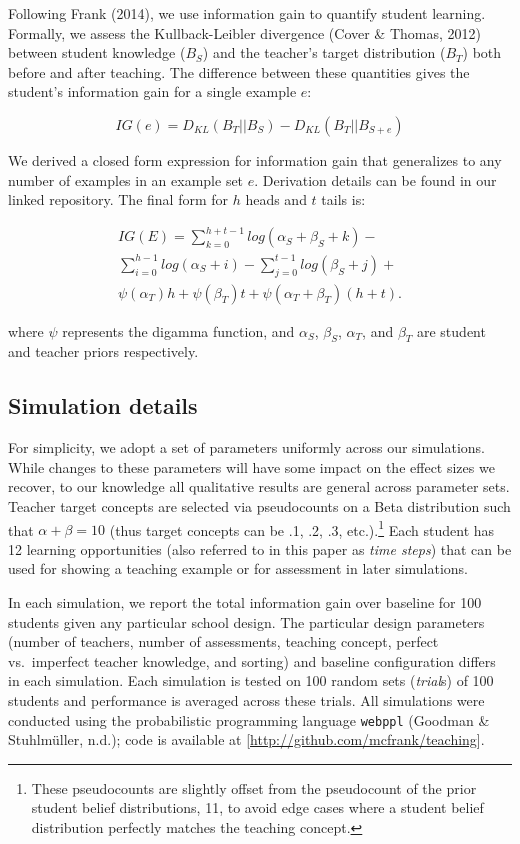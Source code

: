 \documentclass[10pt, letterpaper]{article}
\begin{document}
Following Frank (2014), we use information gain to quantify student
learning. Formally, we assess the Kullback-Leibler divergence (Cover \&
Thomas, 2012) between student knowledge (\(B_S\)) and the teacher's
target distribution (\(B_T\)) both before and after teaching. The
difference between these quantities gives the student's information gain
for a single example \(e\):

\[IG(e) = D_{KL}(B_T ||B_S) - D_{KL}(B_T || B_{S+e})\]

We derived a closed form expression for information gain that
generalizes to any number of examples in an example set \(e\).
Derivation details can be found in our linked repository. The final form
for \(h\) heads and \(t\) tails is:

\begin{multline}
IG(E) = \sum_{k=0}^{h+t-1} {log(\alpha_S + \beta_S + k)} - \\
\sum_{i=0}^{h-1} {log (\alpha_S + i)} - \sum_{j=0}^{t-1} {log(\beta_S +j)} + \\
\psi(\alpha_T)h + \psi(\beta_T)t +  \psi(\alpha_T + \beta_T)(h+t).
\end{multline}

\noindent where \(\psi\) represents the digamma function, and
\(\alpha_S\), \(\beta_S\), \(\alpha_T\), and \(\beta_T\) are student and
teacher priors respectively.

\subsection{Simulation details}\label{simulation-details}

For simplicity, we adopt a set of parameters uniformly across our
simulations. While changes to these parameters will have some impact on
the effect sizes we recover, to our knowledge all qualitative results
are general across parameter sets. Teacher target concepts are selected
via pseudocounts on a Beta distribution such that
\(\alpha + \beta = 10\) (thus target concepts can be .1, .2, .3,
etc.).\footnote{These pseudocounts are slightly offset from the pseudocount of the prior student belief distributions, 11, to avoid edge cases where a student belief distribution perfectly matches the teaching concept.}
Each student has 12 learning opportunities (also referred to in this
paper as \emph{time steps}) that can be used for showing a teaching
example or for assessment in later simulations.

In each simulation, we report the total information gain over baseline
for 100 students given any particular school design. The particular
design parameters (number of teachers, number of assessments, teaching
concept, perfect vs.~imperfect teacher knowledge, and sorting) and
baseline configuration differs in each simulation. Each simulation is
tested on 100 random sets (\emph{trial}s) of 100 students and
performance is averaged across these trials. All simulations were
conducted using the probabilistic programming language \texttt{webppl}
(Goodman \& Stuhlmüller, n.d.); code is available at
{[}\url{http://github.com/mcfrank/teaching}{]}.
\end{document}
